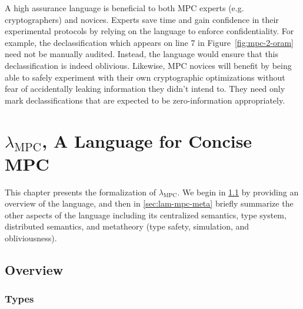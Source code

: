 \documentclass{report}
\newcommand{\mpc}{\ensuremath{\lambda_{\mathrm{MPC}}}\xspace}
\begin{document}
A high assurance language is beneficial to both MPC experts (e.g. cryptographers) and novices. Experts save time and gain confidence in their
experimental protocols by relying on the language to enforce confidentiality. For example, the declassification which appears on line 7 in
Figure~\ref{fig:mpc-2-oram} need not be manually audited. Instead, the language would ensure that this declassification is indeed
oblivious. Likewise, MPC novices will benefit by being able to safely experiment with their own cryptographic optimizations
without fear of accidentally leaking information they didn't intend to. They need only mark declassifications that are expected to be
zero-information appropriately.

\chapter{\mpc, A Language for Concise MPC}
\label{ch:lam-mpc}

This chapter presents the formalization of \mpc. We begin in \cref{sec:lam-mpc-overview} by providing
an overview of the language, and then in \cref{sec:lam-mpc-meta} briefly summarize the other aspects
of the language including its centralized semantics, type system, distributed
semantics, and metatheory (type safety, simulation, and obliviousness).

\section{Overview}
\label{sec:lam-mpc-overview}

\subsection{Types}
\end{document}
